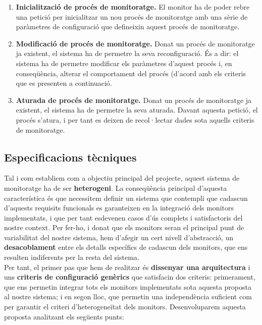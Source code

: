 \begin{enumerate}
\item \textbf{Inicialització de procés de monitoratge.} El monitor ha de poder rebre una petició per inicialitzar un nou procés de monitoratge amb una sèrie de paràmetres de configuració que defineixin aquest procés de monitoratge.
\item \textbf{Modificació de procés de monitoratge.} Donat un procés de monitoratge ja existent, el sistema ha de permetre la seva reconfiguració. És a dir: el sistema ha de permetre modificar els paràmetres d'aquest procés i, en conseqüència, alterar el comportament del procés (d'acord amb els criteris que es presenten a continuació.
\item \textbf{Aturada de procés de monitoratge.} Donat un procés de monitoratge ja existent, el sistema ha de permetre la seva aturada. Davant aquesta petició, el procés s'atura, i per tant es deixen de recol·lectar dades sota aquells criteris de monitoratge.
\end{enumerate}

\subsection{Especificacions tècniques}

Tal i com establiem com a objectiu principal del projecte, aquest sistema de monitoratge ha de ser \textbf{heterogeni}. La conseqüència principal d'aquesta característica és que necessitem definir un sistema que contempli que cadascun d'aquests requisits funcionals es garanteixen en la integració dels monitors implementats, i que per tant esdevenen casos d'ús complets i satisfactoris del nostre context. Per fer-ho, i donat que els monitors seran el principal punt de variabilitat del nostre sistema, hem d'afegir un cert nivell d'abstracció, un \textbf{desacoblament} entre els detalls específics de cadascun dels monitors, que ens resulten indiferents per la resta del sistema.\\

Per tant, el primer pas que hem de realitzar és \textbf{dissenyar una arquitectura} i uns \textbf{criteris de configuració genèrics} que satisfacin dos criteris: primerament, que ens permetin integrar tots els monitors implementats sota aquesta proposta al nostre sistema; i en segon lloc, que permetin una independència suficient com per garantir el criteri d'heterogeneïtat dels monitors. Desenvoluparem aquesta proposta analitzant els següents punts:

